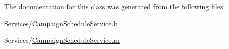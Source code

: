 The documentation for this class was generated from the following files\-:\begin{DoxyCompactItemize}
\item 
Services/\hyperlink{_campaign_schedule_service_8h}{Campaign\-Schedule\-Service.\-h}\item 
Services/\hyperlink{_campaign_schedule_service_8m}{Campaign\-Schedule\-Service.\-m}\end{DoxyCompactItemize}
